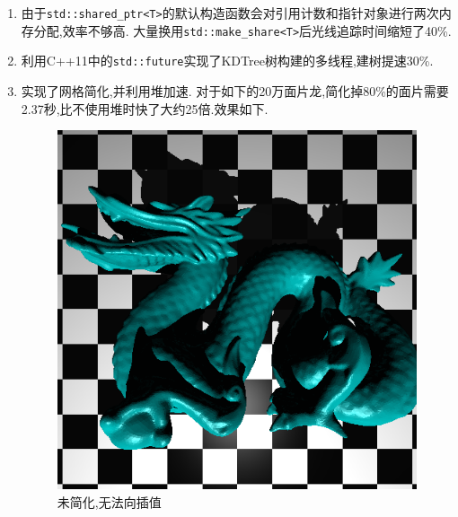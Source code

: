 \begin{enumerate}
\item 由于\verb|std::shared_ptr<T>|的默认构造函数会对引用计数和指针对象进行两次内存分配,效率不够高.
  大量换用\verb|std::make_share<T>|后光线追踪时间缩短了40\%.

  \item 利用C++11中的\verb|std::future|实现了KDTree树构建的多线程,建树提速30\%.

    \newpage
    \item 实现了网格简化,并利用堆加速. 对于如下的20万面片龙,简化掉80\%的面片需要2.37秒,比不使用堆时快了大约25倍.效果如下.
\begin{figure}[H]
\begin{minipage}[b]{0.46\linewidth}
  \centering
  \includegraphics[width=\textwidth]{img/unsimplified_nosmooth.png}
  \caption*{未简化,无法向插值}
\end{minipage}
\begin{minipage}[b]{0.46\linewidth}
  \centering

\end{minipage}
\end{figure}
\end{enumerate}
